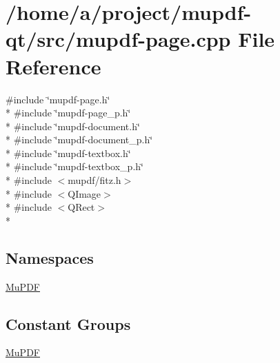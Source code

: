 \hypertarget{mupdf-page_8cpp}{\section{/home/a/project/mupdf-\/qt/src/mupdf-\/page.cpp File Reference}
\label{mupdf-page_8cpp}
}
{\ttfamily \#include \char`\"{}mupdf-\/page.\-h\char`\"{}}\\*
{\ttfamily \#include \char`\"{}mupdf-\/page\-\_\-p.\-h\char`\"{}}\\*
{\ttfamily \#include \char`\"{}mupdf-\/document.\-h\char`\"{}}\\*
{\ttfamily \#include \char`\"{}mupdf-\/document\-\_\-p.\-h\char`\"{}}\\*
{\ttfamily \#include \char`\"{}mupdf-\/textbox.\-h\char`\"{}}\\*
{\ttfamily \#include \char`\"{}mupdf-\/textbox\-\_\-p.\-h\char`\"{}}\\*
{\ttfamily \#include $<$mupdf/fitz.\-h$>$}\\*
{\ttfamily \#include $<$Q\-Image$>$}\\*
{\ttfamily \#include $<$Q\-Rect$>$}\\*
\subsection*{Namespaces}
\begin{DoxyCompactItemize}
\item 
\hyperlink{namespace_mu_p_d_f}{Mu\-P\-D\-F}
\end{DoxyCompactItemize}
\subsection*{Constant Groups}
\begin{DoxyCompactItemize}
\item 
\hyperlink{namespace_mu_p_d_f}{Mu\-P\-D\-F}
\end{DoxyCompactItemize}
